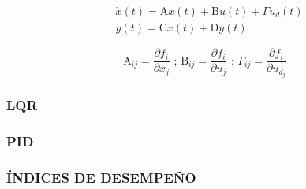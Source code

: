 \begin{equation}
	\begin{aligned}
		& \dot{x}(t) =\mathrm{A}x(t)+ \mathrm{B}u(t)+ \Gamma u_d(t)\\
		& y(t) =\mathrm{C}x(t)+ \mathrm{D}y(t)		
	\end{aligned}
\end{equation}	



\begin{equation}
	\mathrm{A}_{ij}= \frac{\partial f_i}{\partial x_j}
	\text { ; } 
	\mathrm{B}_{ij}= \frac{\partial f_i}{\partial u_j}
	\text { ; }
	\Gamma_{ij}= \frac{\partial f_i}{\partial u_{d_j}}		
\end{equation}

\subsubsection{LQR}
\subsubsection{PID}
\subsubsection{ÍNDICES DE DESEMPEÑO}







